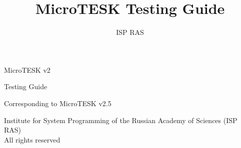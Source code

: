 \documentclass[12pt,letterpaper,extrafontsizes]{memoir}
\title{MicroTESK Testing Guide}
\author{ISP RAS}
\begin{document}

\frontmatter

\pagestyle{empty}


\vspace*{\fill}
\begin{center}
\HUGE\textsf{MicroTESK v2}\par
\end{center}

\begin{center}
\Huge\textsf{Testing Guide}\par
\end{center}

\begin{center}
\normalsize\textsf{Corresponding to MicroTESK v2.5}\par
\end{center}

\vspace*{\fill}
\clearpage


\begingroup
\footnotesize
\setlength{\parindent}{0pt}
\setlength{\parskip}{\baselineskip}
\textcopyright{} Institute for System Programming of the Russian Academy of Sciences (ISP RAS)\\
All rights reserved
\endgroup
\clearpage


\pagestyle{headings}

\tableofcontents


\mainmatter








\end{document}

